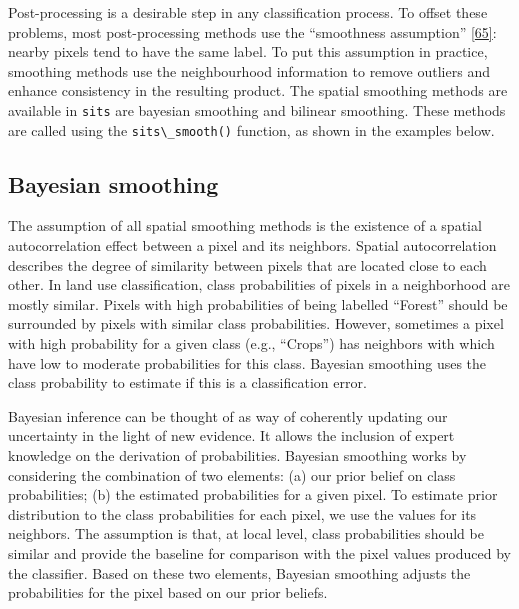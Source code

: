 \documentclass[
  11pt,
]{report}
\newcommand{\passthrough}[1]{#1}
\begin{document}
Post-processing is a desirable step in any classification process. To
offset these problems, most post-processing methods use the ``smoothness
assumption'' \protect\hyperlink{ref-Schindler2012}{{[}65{]}}: nearby
pixels tend to have the same label. To put this assumption in practice,
smoothing methods use the neighbourhood information to remove outliers
and enhance consistency in the resulting product. The spatial smoothing
methods are available in \passthrough{\lstinline!sits!} are bayesian
smoothing and bilinear smoothing. These methods are called using the
\passthrough{\lstinline!sits\_smooth()!} function, as shown in the
examples below.

\hypertarget{bayesian-smoothing}{%
\subsection*{Bayesian smoothing}\label{bayesian-smoothing}}

The assumption of all spatial smoothing methods is the existence of a
spatial autocorrelation effect between a pixel and its neighbors.
Spatial autocorrelation describes the degree of similarity between
pixels that are located close to each other. In land use classification,
class probabilities of pixels in a neighborhood are mostly similar.
Pixels with high probabilities of being labelled ``Forest'' should be
surrounded by pixels with similar class probabilities. However,
sometimes a pixel with high probability for a given class (e.g.,
``Crops'') has neighbors with which have low to moderate probabilities
for this class. Bayesian smoothing uses the class probability to
estimate if this is a classification error.

Bayesian inference can be thought of as way of coherently updating our
uncertainty in the light of new evidence. It allows the inclusion of
expert knowledge on the derivation of probabilities. Bayesian smoothing
works by considering the combination of two elements: (a) our prior
belief on class probabilities; (b) the estimated probabilities for a
given pixel. To estimate prior distribution to the class probabilities
for each pixel, we use the values for its neighbors. The assumption is
that, at local level, class probabilities should be similar and provide
the baseline for comparison with the pixel values produced by the
classifier. Based on these two elements, Bayesian smoothing adjusts the
probabilities for the pixel based on our prior beliefs.
\end{document}
